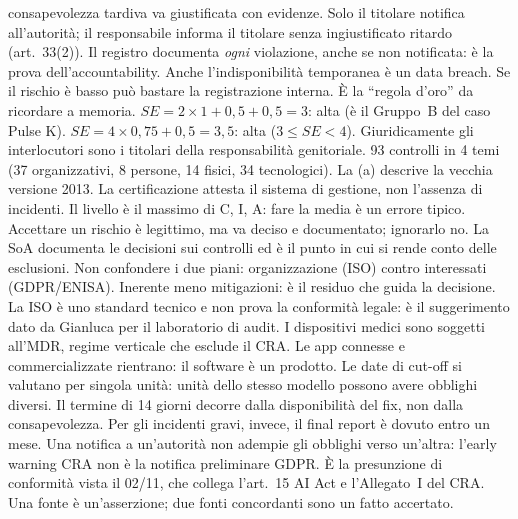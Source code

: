 \begin{description}[leftmargin=2.5em,labelwidth=2em,font=\normalfont\bfseries]
    consapevolezza tardiva va giustificata con evidenze.
   Solo il titolare notifica all'autorità; il responsabile informa il titolare
    senza ingiustificato ritardo (art.~33(2)).
   Il registro documenta \emph{ogni} violazione, anche se non notificata: è la
    prova dell'accountability.
   Anche l'indisponibilità temporanea è un data breach. Se il rischio è basso
    può bastare la registrazione interna.
   È la ``regola d'oro'' da ricordare a memoria.
   $SE = 2 \times 1 + 0{,}5 + 0{,}5 = 3$: alta (è il Gruppo~B del caso Pulse K).
   $SE = 4 \times 0{,}75 + 0{,}5 = 3{,}5$: alta ($3 \le SE < 4$).
   Giuridicamente gli interlocutori sono i titolari della responsabilità genitoriale.
   93 controlli in 4 temi (37 organizzativi, 8 persone, 14 fisici, 34 tecnologici).
    La (a) descrive la vecchia versione 2013.
   La certificazione attesta il sistema di gestione, non l'assenza di
    incidenti.
   Il livello è il massimo di C, I, A: fare la media è un errore tipico.
   Accettare un rischio è legittimo, ma va deciso e documentato; ignorarlo no.
   La SoA documenta le decisioni sui controlli ed è il punto in cui si rende conto delle
    esclusioni.
   Non confondere i due piani: organizzazione (ISO) contro interessati (GDPR/ENISA).
   Inerente meno mitigazioni: è il residuo che guida la decisione.
   La ISO è uno standard tecnico e non prova la conformità legale: è il suggerimento
    dato da Gianluca per il laboratorio di audit.
   I dispositivi medici sono soggetti all'MDR, regime verticale che esclude il CRA.
    Le app connesse e commercializzate rientrano: il software è un prodotto.
   Le date di cut-off si valutano per singola unità: unità dello stesso modello
    possono avere obblighi diversi.
   Il termine di 14 giorni decorre dalla disponibilità del fix, non dalla
    consapevolezza. Per gli incidenti gravi, invece, il final report è dovuto entro un mese.
   Una notifica a un'autorità non adempie gli obblighi verso un'altra: l'early
    warning CRA non è la notifica preliminare GDPR.
   È la presunzione di conformità vista il 02/11, che collega l'art.~15 AI Act e
    l'Allegato~I del CRA.
   Una fonte è un'asserzione; due fonti concordanti sono un fatto accertato.

\end{description}

